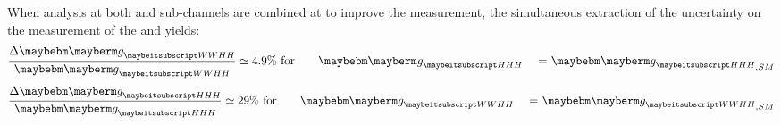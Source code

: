 When analysis at both \eeToHHbbWW and \eeToHHbbbb sub-channels are combined at  to improve the measurement, the simultaneous extraction of the uncertainty on the measurement of the \gHHH and \gWWHH yields:
\begin{equation}
\frac{\Delta\gWWHH}{\gWWHH} \simeq 4.9\% \text{ for \gHHH = $\gHHH_{,SM}$}
\end{equation}
\begin{equation}
\frac{\Delta\gHHH}{\gHHH} \simeq 29\% \text{ for \gWWHH = $\gWWHH_{,SM}$}
\end{equation}

